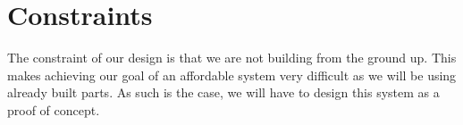 \section{Constraints}
The constraint of our design is that we are not building from the ground up. This makes achieving our goal of an affordable system very difficult as we will be using already built parts. As such is the case, we will have to design this system as a proof of concept.